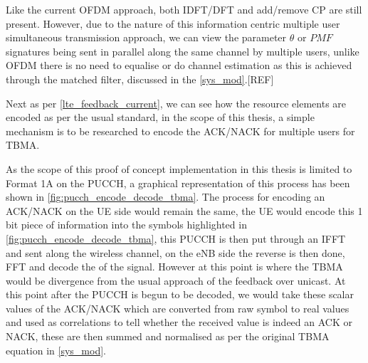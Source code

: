 \documentclass{article}
\begin{document}
Like the current OFDM approach, both IDFT/DFT and add/remove CP are still present. However, due to the nature of this information centric multiple user simultaneous transmission approach, we can view the parameter $\theta$ or $PMF$ signatures being sent in parallel along the same channel by multiple users,  unlike OFDM there is no need to equalise or do channel estimation as this is achieved through the matched filter, discussed in the \cref{sys_mod}.[REF]

Next as per \cref{lte_feedback_current}, we can see how the resource elements are encoded as per the usual standard, in the scope of this thesis, a simple mechanism is to be researched to encode the ACK/NACK for multiple users for TBMA.

As the scope of this proof of concept implementation in this thesis is limited to Format 1A on the PUCCH, a graphical representation of this process has been shown in \cref{fig:pucch_encode_decode_tbma}. The process for encoding an ACK/NACK on the UE side would remain the same, the UE would encode this 1 bit piece of information into the symbols highlighted in \cref{fig:pucch_encode_decode_tbma}, this PUCCH is then put through an IFFT and sent along the wireless channel, on the eNB side the reverse is then done, FFT and decode the of the signal. However at this point is where the TBMA would be divergence from the usual approach of the feedback over unicast. At this point after the PUCCH is begun to be decoded, we would take these scalar values of the ACK/NACK which are converted from raw symbol to real values and used as correlations to tell whether the received value is indeed an ACK or NACK, these are then summed and normalised as per the original TBMA equation in \cref{sys_mod}.
\end{document}
